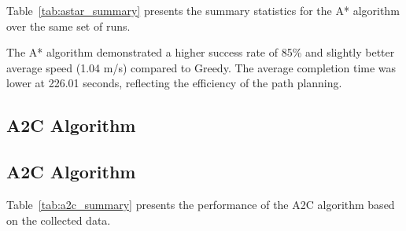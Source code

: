 \documentclass[conference]{IEEEtran}
\begin{document}
Table~\ref{tab:astar_summary} presents the summary statistics for the A* algorithm over the same set of runs.

\begin{table}[ht]
\centering
\caption{Summary statistics for the A* algorithm (100 runs).}
\label{tab:astar_summary}
\end{table}

The A* algorithm demonstrated a higher success rate of 85\% and slightly better average speed (1.04 m/s) compared to Greedy. The average completion time was lower at 226.01 seconds, reflecting the efficiency of the path planning.
\subsection{A2C Algorithm}


\subsection{A2C Algorithm}

Table~\ref{tab:a2c_summary} presents the performance of the A2C algorithm based on the collected data.

\begin{table}[ht]
\centering
\caption{Summary statistics for the A2C algorithm (100 runs).}
\label{tab:a2c_summary}
\end{table}
\end{document}
